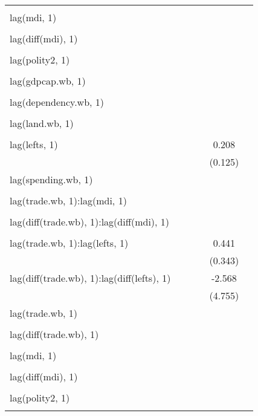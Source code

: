 \begin{tabular}{l*{5}{c}}
  		& 		& 		& 		& 		& \\
lag(mdi, 1) 		& 		& 		& 		& 		& \\
  		& 		& 		& 		& 		& \\
lag(diff(mdi), 1) 		& 		& 		& 		& 		& \\
  		& 		& 		& 		& 		& \\
lag(polity2, 1) 		& 		& 		& 		& 		& \\
  		& 		& 		& 		& 		& \\
lag(gdpcap.wb, 1) 		& 		& 		& 		& 		& \\
  		& 		& 		& 		& 		& \\
lag(dependency.wb, 1) 		& 		& 		& 		& 		& \\
  		& 		& 		& 		& 		& \\
lag(land.wb, 1) 		& 		& 		& 		& 		& \\
  		& 		& 		& 		& 		& \\
lag(lefts, 1) 		& 		& 		& 		&0.208\sym{*} 		& \\
  		& 		& 		& 		&(0.125) 		& \\
lag(spending.wb, 1) 		& 		& 		& 		& 		& \\
  		& 		& 		& 		& 		& \\
lag(trade.wb, 1):lag(mdi, 1) 		& 		& 		& 		& 		& \\
  		& 		& 		& 		& 		& \\
lag(diff(trade.wb), 1):lag(diff(mdi), 1) 		& 		& 		& 		& 		& \\
  		& 		& 		& 		& 		& \\
lag(trade.wb, 1):lag(lefts, 1) 		& 		& 		& 		&0.441 		& \\
  		& 		& 		& 		&(0.343) 		& \\
lag(diff(trade.wb), 1):lag(diff(lefts), 1) 		& 		& 		& 		&-2.568 		& \\
  		& 		& 		& 		&(4.755) 		& \\
lag(trade.wb, 1) 		& 		& 		& 		& 		& \\
  		& 		& 		& 		& 		& \\
lag(diff(trade.wb), 1) 		& 		& 		& 		& 		& \\
  		& 		& 		& 		& 		& \\
lag(mdi, 1) 		& 		& 		& 		& 		& \\
  		& 		& 		& 		& 		& \\
lag(diff(mdi), 1) 		& 		& 		& 		& 		& \\
  		& 		& 		& 		& 		& \\
lag(polity2, 1) 		& 		& 		& 		& 		& \\
  		& 		& 		& 		& 		& \\

\end{tabular}
